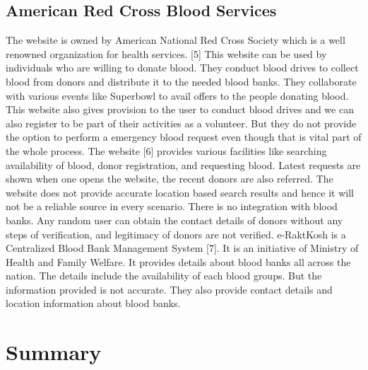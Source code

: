 \subsection{American Red Cross Blood Services}
 The website is owned by American National Red Cross Society which is a well renowned organization for health services. [5] This website can be used by individuals who are willing to donate blood. They conduct blood drives to collect blood from donors and distribute it to the needed blood banks. They collaborate with various events like Superbowl to avail offers to the people donating blood. This website also gives provision to the user to conduct blood drives and we can also register to be part of their activities as a volunteer. But they do not provide the option to perform a emergency blood request even though that is vital part of the whole process.
The website [6] provides various facilities like searching availability of blood, donor registration, and requesting blood. Latest requests are shown when one opens the website, the recent donors are also referred. The website does not provide accurate location based search results and hence it will not be a reliable source in every scenario. There is no integration with blood banks. Any random user can obtain the contact details of donors without any steps of verification, and legitimacy of donors are not verified. 
e-RaktKosh is a Centralized Blood Bank Management System [7]. It is an initiative of Ministry of Health and Family Welfare. It provides details about blood banks all across the nation. The details include the availability of each blood groups. But the information provided is not accurate. They also provide contact details and location information about blood banks.
\section{Summary}
